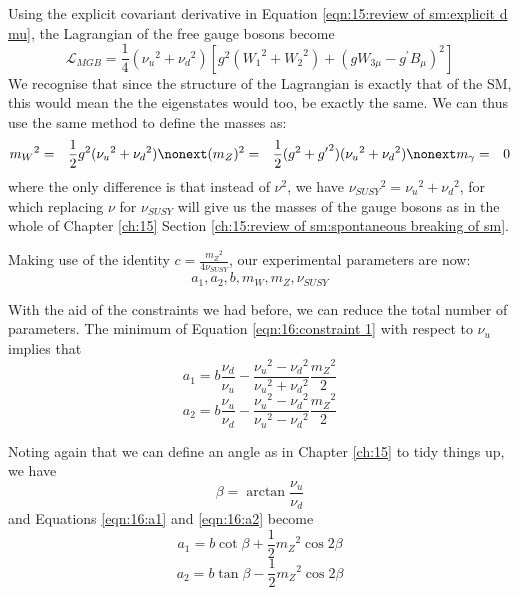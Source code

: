 Using the explicit covariant derivative in Equation \ref{eqn:15:review of sm:explicit d mu}, the Lagrangian of the free gauge bosons become
\begin{equation}
    \mathcal{L}_{MGB} = \frac{1}{4} ({\nu_u}^2 + {\nu_d}^2) \left[ g^2 \left({W_1}^2 + {W_2}^2\right) + \left( g W_{3\mu} - g^\prime B_\mu \right)^2 \right]
\end{equation}
We recognise that since the structure of the Lagrangian is exactly that of the SM, this would mean the the eigenstates would too, be exactly the same. We can thus use the same method to define the masses as:
\begin{eqnarray}
    {m_W}^2 &=& \frac{1}{2} g^2 ({\nu_u}^2 + {\nu_d}^2) \nonext
    (m_Z)^2 &=& \frac{1}{2} (g^2 + {g^\prime}^2) ({\nu_u}^2 + {\nu_d}^2) \nonext
    m_\gamma &=& 0
\end{eqnarray}
where the only difference is that instead of $\nu^2$, we have ${\nu_{SUSY}}^2 = {\nu_u}^2 + {\nu_d}^2$, for which replacing $\nu$ for $\nu_{SUSY}$ will give us the masses of the gauge bosons as in the whole of Chapter \ref{ch:15} Section \ref{ch:15:review of sm:spontaneous breaking of sm}.

Making use of the identity $c = \frac{{m_Z}^2}{4 \nu_{SUSY}}$, our experimental parameters are now:
\begin{equation}
    a_1, a_2, b, m_W, m_Z, \nu_{SUSY}
\end{equation}

With the aid of the constraints we had before, we can reduce the total number of parameters. The minimum of Equation \ref{eqn:16:constraint 1} with respect to $\nu_u$ implies that 
\begin{equation}
    a_1 = b\frac{\nu_d}{\nu_u} - \frac{{\nu_u}^2 - {\nu_d}^2}{{\nu_u}^2 + {\nu_d}^2} \frac{{m_Z}^2}{2}
    \label{eqn:16:a1}
\end{equation}
\begin{equation}
    a_2 = b\frac{\nu_u}{\nu_d} - \frac{{\nu_u}^2 - {\nu_d}^2}{{\nu_u}^2 - {\nu_d}^2} \frac{{m_Z}^2}{2}
    \label{eqn:16:a2}
\end{equation}

Noting again that we can define an angle as in Chapter \ref{ch:15} to tidy things up, we have
\begin{equation}
    \beta = \arctan \frac{\nu_u}{\nu_d}
    \label{eqn:16:beta}
\end{equation}
and Equations \ref{eqn:16:a1} and \ref{eqn:16:a2} become
\begin{equation}
    a_1 = b \cot \beta + \frac{1}{2} {m_Z}^2 \cos 2 \beta
\end{equation}
\begin{equation}
    a_2 = b \tan \beta - \frac{1}{2} {m_Z}^2 \cos 2 \beta
\end{equation}

